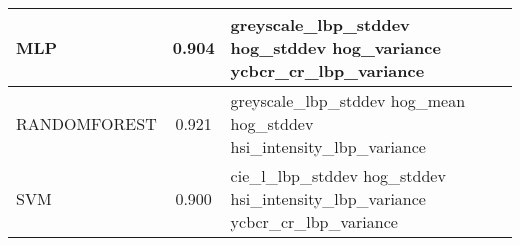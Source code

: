 \begin{longtable}{lcll}
\midrule
MLP  & 0.904 &\begin{minipage}[t]{0.5\textwidth} greyscale\_lbp\_stddev hog\_stddev hog\_variance ycbcr\_cr\_lbp\_variance \end{minipage} \vspace{3pt}\\
\midrule
RANDOMFOREST  & 0.921 &\begin{minipage}[t]{0.5\textwidth}  greyscale\_lbp\_stddev hog\_mean hog\_stddev hsi\_intensity\_lbp\_variance \end{minipage} \vspace{3pt}\\
\midrule
SVM  & 0.900 &\begin{minipage}[t]{0.5\textwidth}   cie\_l\_lbp\_stddev hog\_stddev hsi\_intensity\_lbp\_variance ycbcr\_cr\_lbp\_variance \end{minipage} \vspace{3pt}\\
\end{longtable}
